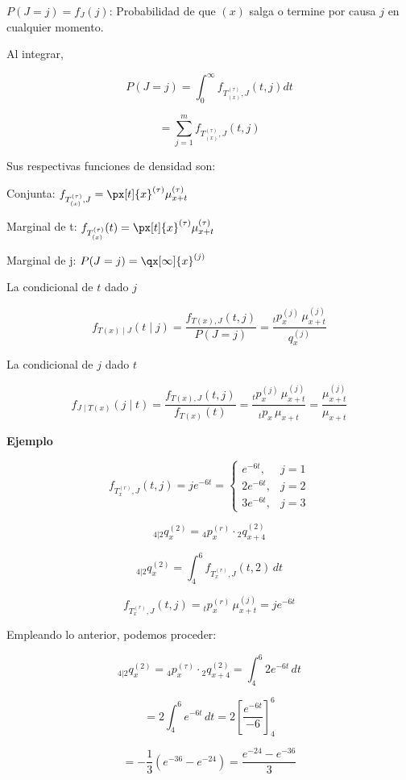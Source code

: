 \documentclass[12pt, a4paper, footinclude=true]{scrbook}
\begin{document}
	$P(J=j) = f_{J}(j)$: Probabilidad de que $(x)$ salga o termine por causa $j$ en cualquier momento. 
	
	
	Al integrar, 
	
	$$ 
	P(J=j) = \int_{0}^\infty f_{T^{(\tau)}_{(x)}, J} (t, j)dt
	$$
	
	\[
		= \sum^{m}_{j=1} f_{T^{(\tau)}_{(x)}, J} (t, j)
	\]
	
	Sus respectivas funciones de densidad son: 
	
	Conjunta: $f_{T^{(\tau)}_{(x)}, J} = \px[t]{x}^{(\tau)} \mu_{x+t}^{(\tau)}$
	
	Marginal de t: $f_{T^{(\tau)}_{(x)}}(t) = \px[t]{x}^{(\tau)} \mu_{x+t}^{(\tau)}$
	
	Marginal de j: $P(J=j) = \qx[\infty]{x}^{(j)}$
	
	La condicional de $t$ dado $j$
	
	\[
	f_{T(x)\mid J}(t \mid j)
	=
	\frac{f_{T(x),J}(t,j)}{P(J=j)}
	=
	\frac{{}_t p_x^{(j)} \, \mu_{x+t}^{(j)}}{q_x^{(j)}}
	\]
	
	La condicional de $j$ dado $t$
	
	\[
	f_{J \mid T(x)}(j \mid t)
	=
	\frac{f_{T(x),J}(t,j)}{f_{T(x)}(t)}
	=
	\frac{{}_t p_x^{(j)} \, \mu_{x+t}^{(j)}}{{}_t p_x \, \mu_{x+t}}
	=
	\frac{\mu_{x+t}^{(j)}}{\mu_{x+t}}
	\]
	
	\textbf{Ejemplo}
	
	\[
	f_{T_x^{(r)},J}(t,j) = j e^{-6t}
		=
	\begin{cases}
		e^{-6t}, & j = 1 \\
		2e^{-6t}, & j = 2 \\
		3e^{-6t}, & j = 3
	\end{cases}
	\]
	
	\[
	{}_{4|2} q_x^{(2)} = {}_4 p_x^{(r)} \cdot {}_2 q_{x+4}^{(2)}
	\]
	
	\[
	{}_{4|2} q_x^{(2)} = \int_{4}^{6} f_{T_x^{(r)},J}(t,2)\, dt
	\]
	
	\[
	f_{T_x^{(r)},J}(t,j) = {}_t p_x^{(r)} \, \mu_{x+t}^{(j)} = j e^{-6t}
	\]
	
	Empleando lo anterior, podemos proceder: 
	
	\[
	{}_{4|2} q_x^{(2)} 
	= {}_4 p_x^{(\tau)} \cdot {}_2 q_{x+4}^{(2)}
	= \int_{4}^{6} 2e^{-6t}\, dt
	\]
	
	\[
	= 2 \int_{4}^{6} e^{-6t}\, dt
	= 2 \left[ \frac{e^{-6t}}{-6} \right]_{4}^{6}
	\]
	
	\[
	= -\frac{1}{3} \left( e^{-36} - e^{-24} \right)
	= \frac{e^{-24} - e^{-36}}{3}
	\]
	
\end{document}
